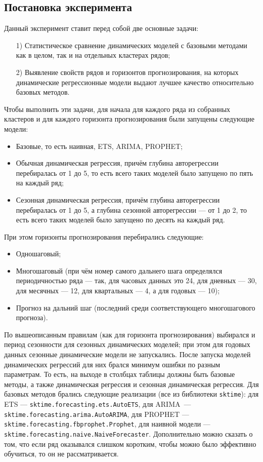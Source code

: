 \documentclass[a4paper,14pt]{extarticle}
\begin{document}
	\subsection{Постановка эксперимента}
	Данный эксперимент ставит перед собой две основные задачи:
	\begin{enumerate}
		\item[1)] Статистическое сравнение динамических моделей с базовыми методами как в целом, так и на отдельных кластерах рядов;
  		\item[2)] Выявление свойств рядов и горизонтов прогнозирования, на которых динамические регрессионные модели выдают лучшее качество относительно базовых методов.
	\end{enumerate}
	Чтобы выполнить эти задачи, для начала для каждого ряда из собранных кластеров и для каждого горизонта прогнозирования были запущены следующие модели:
	\begin{itemize}
		\item Базовые, то есть наивная, ETS, ARIMA, PROPHET;
  		\item Обычная динамическая регрессия, причём глубина авторегрессии перебиралась от 1 до 5, то есть всего таких моделей было запущено по пять на каждый ряд;
    	\item Сезонная динамическая регрессия, причём глубина авторегрессии перебиралась от 1 до 5, а глубина сезонной авторегрессии --- от 1 до 2, то есть всего таких моделей было запущено по десять на каждый ряд.
	\end{itemize} 
	При этом горизонты прогнозирования перебирались следующие:
	\begin{itemize}
		\item Одношаговый;
  		\item Многошаговый (при чём номер самого дальнего шага определялся периодичностью ряда --- так, для часовых данных это 24, для дневных --- 30, для месячных --- 12, для квартальных --- 4, а для годовых --- 10);
    	\item Прогноз на дальний шаг (последний среди соответствующего многошагового прогноза).
	\end{itemize}
	По вышеописанным правилам (как для горизонта прогнозирования) выбирался и период сезонности для сезонных динамических моделей; при этом для годовых данных сезонные динамические модели не запускались. После запуска моделей динамических регрессий для них брался минимум ошибки по разным параметрам. То есть, на выходе в столбцах таблицы должны быть базовые методы, а также динамическая регрессия и сезонная динамическая регрессия. Для базовых методов брались следующие реализации (все из библиотеки \texttt{sktime}): для ETS --- \texttt{sktime.forecasting.ets.AutoETS}, для ARIMA~--- \texttt{sktime.forecasting.arima.AutoARIMA}, для PROPHET --- \\\texttt{sktime.forecasting.fbprophet.Prophet}, для наивной модели --- \\\texttt{sktime.forecasting.naive.NaiveForecaster}. Дополнительно можно сказать о том, что если ряд оказывался слишком коротким, чтобы можно было эффективно обучиться, то он не рассматривается.
\end{document}
